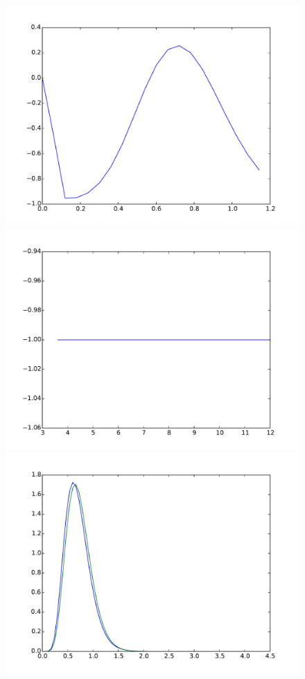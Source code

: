 \documentclass{article}
\begin{document}
\begin{figure}[htb]
\begin{minipage}{.3\textwidth}
		\includegraphics[width=0.97\linewidth]{bootstrap-filter/relative_beginning_complex_3_1.pdf}
	\end{minipage}
	\begin{minipage}{.3\textwidth}
		\centering
		\includegraphics[width=0.97\linewidth]{bootstrap-filter/relative_tail_complex_3_1.pdf}
	\end{minipage}
	\begin{minipage}{.3\textwidth}
		\centering
		\includegraphics[width=0.97\linewidth]{bootstrap-filter/global_complex_3_9.pdf}

\end{minipage}
\end{figure}
\end{document}
